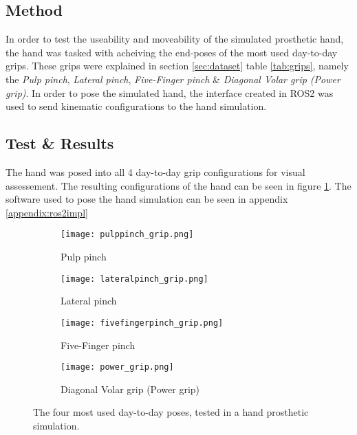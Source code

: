 \documentclass[../main.tex]{subfiles}
\begin{document}
\subsection{Method}
In order to test the useability and moveability of the simulated prosthetic hand, the hand was tasked with acheiving the end-poses of the most used day-to-day grips.
These grips were explained in section \ref{sec:dataset} table \ref{tab:grips}, namely the \textit{Pulp pinch}, \textit{Lateral pinch}, \textit{Five-Finger pinch} \& \textit{Diagonal Volar grip (Power grip)}.
In order to pose the simulated hand, the interface created in ROS2 was used to send kinematic configurations to the hand simulation.

\subsection{Test \& Results}

The hand was posed into all 4 day-to-day grip configurations for visual assessement.
The resulting configurations of the hand can be seen in figure  \ref{fig:hand_pose_test}.
The software used to pose the hand simulation can be seen in appendix \ref{appendix:ros2impl} 

\begin{figure}
    \centering
    \begin{subfigure}[b]{0.49\textwidth}
        \centering
        \texttt{[image: pulppinch\_grip.png]}
        \caption{Pulp pinch}
    \end{subfigure}
    \hfill
    \centering
    \begin{subfigure}[b]{0.49\textwidth}
        \centering
        \texttt{[image: lateralpinch\_grip.png]}
        \caption{Lateral pinch}
    \end{subfigure}
    \hfill
    \begin{subfigure}[b]{0.49\textwidth}
        \centering
        \texttt{[image: fivefingerpinch\_grip.png]}
        \caption{Five-Finger pinch}
    \end{subfigure}
    \hfill
    \begin{subfigure}[b]{0.49\textwidth}
        \centering
        \texttt{[image: power\_grip.png]}
        \caption{Diagonal Volar grip (Power grip)}
    \end{subfigure}
    \caption{The four most used day-to-day poses, tested in a hand prosthetic simulation.}
    \label{fig:hand_pose_test}
\end{figure}
\end{document}
